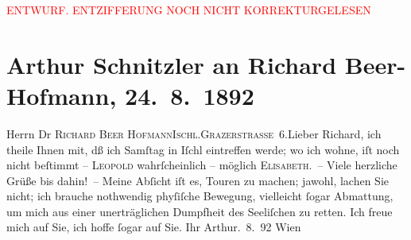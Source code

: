 
\begin{center}
            \textcolor{red}{ENTWURF. ENTZIFFERUNG NOCH NICHT KORREKTURGELESEN}
                      \end{center}
            
               \section[Arthur Schnitzler an Richard Beer-Hofmann, 24. 8. 1892]{ Arthur Schnitzler an Richard Beer-Hofmann, 24. 8. 1892}\nopagebreak{}\rehead{ }\begin{ledgroupsized}[t]{13cm}\normalsize\beginnumbering{} \toendnotes[C]{\smallbreak\pagebreak[2]} 
\pstart{}{\pb}Herrn Dr \textsc{Richard Beer
                     Hofmann}\pend{}\pstart{}\textsc{Ischl.}\pend{}\pstart{}\textsc{Grazerstraße 6}.\pend{}{\bigskip}\pstart{}{\pb}Lieber Richard,\pend\pstart
           ich theile Ihnen mit, dß ich Samſtag in Iſchl eintreffen werde; wo ich wohne, iſt noch nicht beſtimmt – \textsc{Leopold} wahrſcheinlich – möglich \textsc{Elisabeth}. –\pend
           \pstart
           {\pb}Viele herzliche Grüße bis dahin! – \pend
           \pstart
           Meine Abſicht iſt es, Touren zu machen; jawohl, lachen Sie nicht; ich brauche
               nothwendig phyſiſche Bewegung, vielleicht ſogar Abmattung, um mich aus einer {\pb}unerträglichen Dumpfheit des Seeliſchen zu retten.\pend
           \pstart
           Ich freue mich auf Sie, ich hoffe ſogar auf Sie.\pend
           \pstart Ihr \spacefill\mbox{Arthur}\pend{}. 8. 92{ }Wien\pend
           \endnumbering{}\end{ledgroupsized}  \newcommand{\dateiname}{L00118}\newcommand{\titel}{Arthur Schnitzler an Richard Beer-Hofmann, 24. 8. 1892}\newcommand{\editorInnen}{Martin Anton Müller und Gerd-Hermann Susen}
      